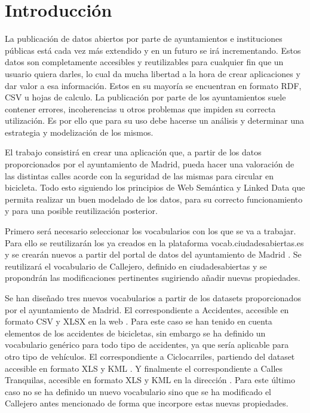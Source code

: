 \chapter{Introducción}

La publicación de datos abiertos por parte de ayuntamientos e instituciones públicas está cada vez más extendido y en un futuro se irá incrementando. Estos datos son completamente accesibles y reutilizables para cualquier fin que un usuario quiera darles, lo cual da mucha libertad a la hora de crear aplicaciones y dar valor a esa información.
Estos en su mayoría se encuentran en formato RDF, CSV u hojas de calculo. La publicación por parte de los ayuntamientos suele contener errores, incoherencias u otros problemas que impiden su correcta utilización. Es por ello que para su uso debe hacerse un análisis y determinar una estrategia y modelización de los mismos.


El trabajo consistirá en crear una aplicación que, a partir de los datos proporcionados por el ayuntamiento de Madrid, pueda hacer una valoración de las distintas calles acorde con la seguridad de las mismas para circular en bicicleta. Todo esto siguiendo los principios de Web Semántica y Linked Data que permita realizar un buen modelado de los datos, para su correcto funcionamiento y para una posible reutilización posterior.


Primero será necesario seleccionar los vocabularios con los que se va a trabajar. Para ello se reutilizarán los ya creados en la plataforma vocab.ciudadesabiertas.es \cite{ciudadesabiertas_catalogoVocabs} y se crearán nuevos a partir del portal de datos del ayuntamiento de Madrid \cite{datosabiertos_ayuntmadrid}. Se reutilizará el vocabulario de Callejero, definido en ciudadesabiertas\cite{ciudadesbiertas_callejero} y se propondrán las modificaciones pertinentes sugiriendo añadir nuevas propiedades.

Se han diseñado tres nuevos vocabularios a partir de los datasets proporcionados por el ayuntamiento de Madrid. El correspondiente a Accidentes, accesible en formato CSV y XLSX en la web \cite{datosMadrid_accidentesDeBicicleta}. Para este caso se han tenido en cuenta elementos de los accidentes de bicicletas, sin embargo se ha definido un vocabulario genérico para todo tipo de accidentes, ya que sería aplicable para otro tipo de vehículos. El correspondiente a Ciclocarriles, partiendo del dataset accesible en formato XLS y KML \cite{datosMadrid_ciclocarriles}. Y finalmente el correspondiente a Calles Tranquilas, accesible en formato XLS y KML en la dirección \cite{datosMadrid_callesTranquilas}. Para este último caso no se ha definido un nuevo vocabulario sino que se ha modificado el Callejero antes mencionado de forma que incorpore estas nuevas propiedades.


